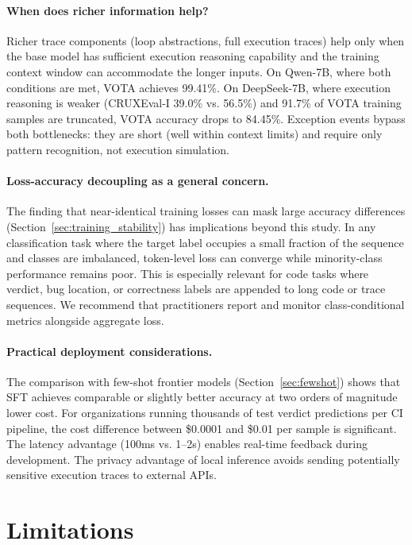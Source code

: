 \documentclass[11pt]{article}
\begin{document}
\paragraph{When does richer information help?}
Richer trace components (loop abstractions, full execution traces) help only when the base model has sufficient execution reasoning capability and the training context window can accommodate the longer inputs. On Qwen-7B, where both conditions are met, VOTA achieves 99.41\%. On DeepSeek-7B, where execution reasoning is weaker (CRUXEval-I 39.0\% vs. 56.5\%) and 91.7\% of VOTA training samples are truncated, VOTA accuracy drops to 84.45\%. Exception events bypass both bottlenecks: they are short (well within context limits) and require only pattern recognition, not execution simulation.

\paragraph{Loss-accuracy decoupling as a general concern.}
The finding that near-identical training losses can mask large accuracy differences (Section~\ref{sec:training_stability}) has implications beyond this study. In any classification task where the target label occupies a small fraction of the sequence and classes are imbalanced, token-level loss can converge while minority-class performance remains poor. This is especially relevant for code tasks where verdict, bug location, or correctness labels are appended to long code or trace sequences. We recommend that practitioners report and monitor class-conditional metrics alongside aggregate loss.

\paragraph{Practical deployment considerations.}
The comparison with few-shot frontier models (Section~\ref{sec:fewshot}) shows that SFT achieves comparable or slightly better accuracy at two orders of magnitude lower cost. For organizations running thousands of test verdict predictions per CI pipeline, the cost difference between \$0.0001 and \$0.01 per sample is significant. The latency advantage (100ms vs. 1--2s) enables real-time feedback during development. The privacy advantage of local inference avoids sending potentially sensitive execution traces to external APIs.

\section{Limitations}
\label{sec:limitations}
\end{document}
